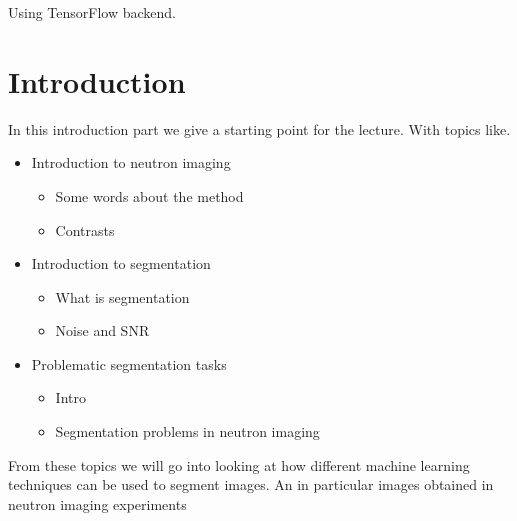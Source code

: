 \documentclass[letterpaper,10pt,english]{sphinxmanual}
\begin{document}
\begin{sphinxVerbatim}[commandchars=\\\{\}]
Using TensorFlow backend.
\end{sphinxVerbatim}

\begin{sphinxVerbatim}[commandchars=\\\{\}]
 
\end{sphinxVerbatim}


\chapter{Introduction}
\label{\detokenize{ML4NeutronImageSegmentation:introduction}}
In this introduction part we give a starting point for the lecture. With topics like.
\begin{itemize}
\item {} 
Introduction to neutron imaging
\begin{itemize}
\item {} 
Some words about the method

\item {} 
Contrasts

\end{itemize}

\item {} 
Introduction to segmentation
\begin{itemize}
\item {} 
What is segmentation

\item {} 
Noise and SNR

\end{itemize}

\item {} 
Problematic segmentation tasks
\begin{itemize}
\item {} 
Intro

\item {} 
Segmentation problems in neutron imaging

\end{itemize}

\end{itemize}

From these topics we will go into looking at how different machine learning techniques can be used to segment images. An in particular images obtained in neutron imaging experiments
\end{document}
